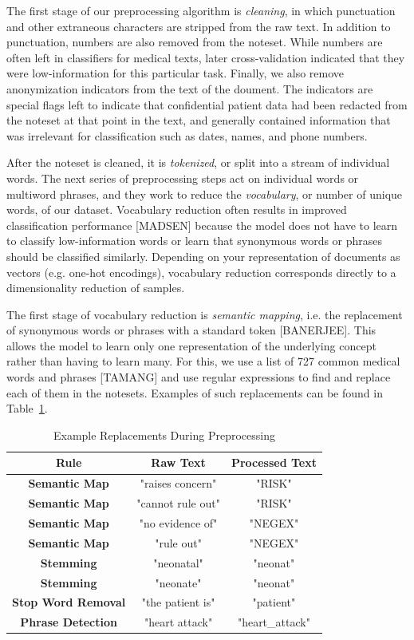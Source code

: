 \documentclass[conference]{IEEEtran}
\begin{document}
The first stage of our preprocessing algorithm is \textit{cleaning}, in which punctuation and other extraneous characters are stripped from the raw text. In addition to punctuation, numbers are also removed from the noteset. While numbers are often left in classifiers for medical texts, later cross-validation indicated that they were low-information for this particular task. Finally, we also remove anonymization indicators from the text of the doument. The indicators are special flags left to indicate that confidential patient data had been redacted from the noteset at that point in the text, and generally contained information that was irrelevant for classification such as dates, names, and phone numbers.

After the noteset is cleaned, it is \textit{tokenized}, or split into a stream of individual words. The next series of preprocessing steps act on individual words or multiword phrases, and they work to reduce the \textit{vocabulary}, or number of unique words, of our dataset. Vocabulary reduction often results in improved classification performance [MADSEN] because the model does not have to learn to classify low-information words or learn that synonymous words or phrases should be classified similarly. Depending on your representation of documents as vectors (e.g. one-hot encodings), vocabulary reduction corresponds directly to a dimensionality reduction of samples.

The first stage of vocabulary reduction is \textit{semantic mapping}, i.e. the replacement of synonymous words or phrases with a standard token [BANERJEE]. This allows the model to learn only one representation of the underlying concept rather than having to learn many. For this, we use a list of 727 common medical words and phrases [TAMANG] and use regular expressions to find and replace each of them in the notesets. Examples of such replacements can be found in Table~\ref{reptab}.
\begin{table}[htbp]
\caption{Example Replacements During Preprocessing}
\begin{center}
\begin{tabular}{ccc}
\textbf{Rule}&\textbf{Raw Text}&\textbf{Processed Text} \\
\hline
\textbf{Semantic Map} & "raises concern" & "RISK" \\
\textbf{Semantic Map} & "cannot rule out" & "RISK" \\
\textbf{Semantic Map} & "no evidence of" & "NEGEX" \\
\textbf{Semantic Map} & "rule out" & "NEGEX" \\
\textbf{Stemming} & "neonatal" & "neonat" \\
\textbf{Stemming} & "neonate" & "neonat" \\
\textbf{Stop Word Removal} & "the patient is" & "patient" \\
\textbf{Phrase Detection} & "heart attack" & "heart\_attack" \\
\end{tabular}
\label{reptab}
\end{center}
\end{table}
\end{document}
